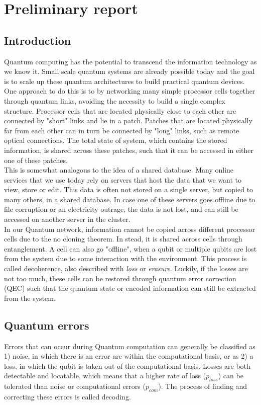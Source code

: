 \section{Preliminary report}

\subsection*{Introduction}

Quantum computing has the potential to transcend the information technology as we know it. Small scale quantum systems are already possible today and the goal is to scale up these quantum architectures to build practical quantum devices. One approach to do this is to by networking many simple processor cells together through quantum links, avoiding the necessity to build a single complex structure. Processor cells that are located physically close to each other are connected by "short" links and lie in a patch. Patches that are located physically far from each other can in turn be connected by "long" links, such as remote optical connections. The total state of system, which contains the stored information, is shared across these patches, such that it can be accessed in either one of these patches. \\

This is somewhat analogous to the idea of a shared database. Many online services that we use today rely on servers that host the data that we want to view, store or edit. This data is often not stored on a single server, but copied to many others, in a shared database. In case one of these servers goes offline due to file corruption or an electricity outrage, the data is not lost, and can still be accessed on another server in the cluster.\\

In our Quantum network, information cannot be copied across different processor cells due to the no cloning theorem. In stead, it is shared across cells through entanglement. A cell can also go "offline", when a qubit or multiple qubits are lost from the system due to some interaction with the environment. This process is called decoherence, also described with \emph{loss} or \emph{erasure}. Luckily, if the losses are not too much, these cells can be restored through quantum error correction (QEC) such that the quantum state or encoded information can still be extracted from the system. \\

\subsection*{Quantum errors}
Errors that can occur during Quantum computation can generally be classified as 1) noise, in which there is an error are within the computational basis, or as 2) a loss, in which the qubit is
taken out of the computational basis. Losses are both detectable and locatable, which means that a higher rate of loss ($p_{loss}$) can be tolerated than noise or computational errors ($p_{com}$). The process of finding and correcting these errors is called decoding. \\

